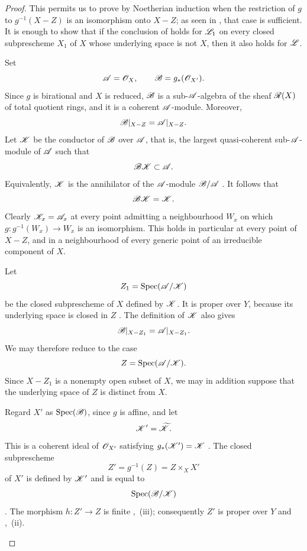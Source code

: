 \begin{proof}

This permits us to prove  by Noetherian induction
 when the restriction of $g$ to $g^{-1}(X-Z)$ is an
isomorphism onto $X-Z$; as seen in , that case is
sufficient.
It is enough to show that if the conclusion of  holds
for $\mathscr{L}_1$ on every closed subprescheme $X_1$ of $X$ whose
underlying space is not $X$, then it also holds for $\mathscr{L}$.

\begin{env}[2.6.2.4]
\label{III.2.6.2.4}
Set
\[
  \mathscr{A}=\mathscr{O}_X,
  \qquad
  \mathscr{B}=g_*(\mathscr{O}_{X'}).
\]
Since $g$ is birational and $X$ is reduced, $\mathscr{B}$ is a
sub-$\mathscr{A}$-algebra of the sheaf $\mathscr{R}(X)$ of total quotient rings,
and it is a coherent $\mathscr{A}$-module.
Moreover,
\[
  \mathscr{B}|_{X-Z}=\mathscr{A}|_{X-Z}.
\]
Let $\mathscr{K}$ be the conductor of $\mathscr{B}$ over $\mathscr{A}$, that is, the
largest quasi-coherent sub-$\mathscr{A}$-module of $\mathscr{A}$ such that
\[
  \mathscr{B}\mathscr{K}\subset\mathscr{A}.
\]
Equivalently, $\mathscr{K}$ is the annihilator of the
$\mathscr{A}$-module $\mathscr{B}/\mathscr{A}$ .
It follows that
\[
  \mathscr{B}\mathscr{K}=\mathscr{K}.
\]
Clearly $\mathscr{K}_x=\mathscr{A}_x$ at every point admitting a neighbourhood
$W_x$ on which $g:g^{-1}(W_x)\to W_x$ is an isomorphism.
This holds in particular at every point of $X-Z$, and in a
neighbourhood of every generic point of an irreducible component of
$X$.

Let
\[
  Z_1=\operatorname{Spec}(\mathscr{A}/\mathscr{K})
\]
be the closed subprescheme of $X$ defined by $\mathscr{K}$.
It is proper over $Y$, because its underlying space is closed in $Z$
.
The definition of $\mathscr{K}$ also gives
\[
  \mathscr{B}|_{X-Z_1}=\mathscr{A}|_{X-Z_1}.
\]
We may therefore reduce to the case
\[
  Z=\operatorname{Spec}(\mathscr{A}/\mathscr{K}).
\]
Since $X-Z_1$ is a nonempty open subset of $X$, we may in addition
suppose that the underlying space of $Z$ is distinct from $X$.
\end{env}

\begin{env}[2.6.2.5]
\label{III.2.6.2.5}
Regard $X'$ as $\operatorname{Spec}(\mathscr{B})$, since $g$ is affine, and let
\[
  \mathscr{K}'=\widetilde{\mathscr{K}}.
\]
This is a coherent ideal of $\mathscr{O}_{X'}$ satisfying
$g_*(\mathscr{K}')=\mathscr{K}$ .
The closed subprescheme
\[
  Z'=g^{-1}(Z)=Z\times_X X'
\]
of $X'$ is defined by $\mathscr{K}'$ and is equal to
\[
  \operatorname{Spec}(\mathscr{B}/\mathscr{K})
\]
.
The morphism $h:Z'\to Z$ is finite ,~(iii);
consequently $Z'$ is proper over $Y$  and
,~(ii).


\end{env}
\end{proof}
